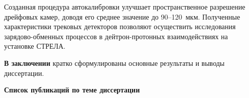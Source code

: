 Созданная процедура автокалибровки улучшает пространственное \linebreak
разрешение дрейфовых камер, доводя его среднее значение до 90--120~мкм.
Полученные характеристики трековых детекторов позволяют осуществить
исследования зарядово-обменных процессов в дейтрон-протонных взаимодействиях на
установке СТРЕЛА.

\vspace{1ex}
\textbf{В заключении} кратко сформулированы основные результаты и выводы
диссертации.

\vspace{1ex}
\begin{center}
  \textbf{Список публикаций по теме диссертации}
\end{center}

\renewcommand\bibsection{}
\renewcommand\baselinestretch{1.125}
\small



